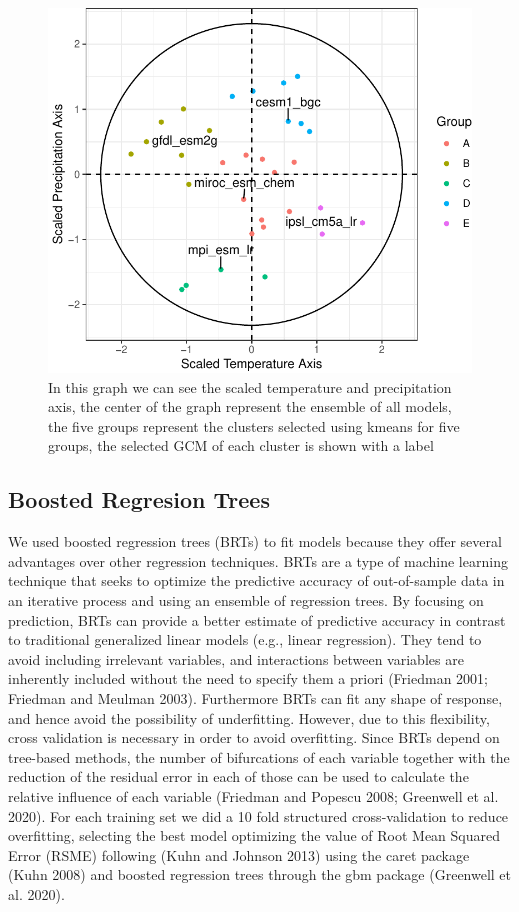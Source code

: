\documentclass[
]{article}
\begin{document}
\begin{figure}
\centering
\includegraphics{Methods_files/figure-latex/SelectedGCMs-1.pdf}
\caption{\label{fig:SelectedGCMs}In this graph we can see the scaled temperature and precipitation axis, the center of the graph represent the ensemble of all models, the five groups represent the clusters selected using kmeans for five groups, the selected GCM of each cluster is shown with a label}
\end{figure}

\hypertarget{boosted-regresion-trees}{%
\subsection{Boosted Regresion Trees}\label{boosted-regresion-trees}}

We used boosted regression trees (BRTs) to fit models because they offer several advantages over other regression techniques. BRTs are a type of machine learning technique that seeks to optimize the predictive accuracy of out-of-sample data in an iterative process and using an ensemble of regression trees. By focusing on prediction, BRTs can provide a better estimate of predictive accuracy in contrast to traditional generalized linear models (e.g., linear regression). They tend to avoid including irrelevant variables, and interactions between variables are inherently included without the need to specify them a priori (Friedman 2001; Friedman and Meulman 2003). Furthermore BRTs can fit any shape of response, and hence avoid the possibility of underfitting. However, due to this flexibility, cross validation is necessary in order to avoid overfitting. Since BRTs depend on tree-based methods, the number of bifurcations of each variable together with the reduction of the residual error in each of those can be used to calculate the relative influence of each variable (Friedman and Popescu 2008; Greenwell et al. 2020).
For each training set we did a 10 fold structured cross-validation to reduce overfitting, selecting the best model optimizing the value of Root Mean Squared Error (RSME) following (Kuhn and Johnson 2013) using the caret package (Kuhn 2008) and boosted regression trees through the gbm package (Greenwell et al. 2020).
\end{document}
